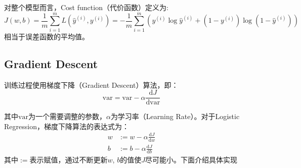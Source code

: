 对整个模型而言，Cost function（代价函数）定义为:
\begin{equation}
	J(w, b) = \frac{1}{m} \sum_{i=1}^{m} L(\hat{y}^{(i)}, y^{(i)}) = -\frac{1}{m} \sum_{i=1}^{m} (y^{(i)} \log \hat{y}^{(i)} + (1 - y^{(i)}) \log (1 - \hat{y}^{(i)})) \label{eq:cost}
\end{equation}
相当于误差函数的平均值。

\subsection{Gradient Descent}

训练过程使用梯度下降（Gradient Descent）算法，即：
\begin{equation}
	\mathrm{var} = \mathrm{var} - \alpha \frac{\mathrm{d}J}{\mathrm{d}\mathrm{var}} \label{eq:gradient}
\end{equation}

其中$\mathrm{var}$为一个需要调整的参数，$\alpha$为学习率（Learning Rate）。对于Logistic Regression，梯度下降算法的表达式为：
\begin{equation}
	\begin{aligned}
	w &:= w - \alpha \frac{\mathrm{d}J}{\mathrm{d}w} \\
	b &:= b - \alpha \frac{\mathrm{d}J}{\mathrm{d}b}
	\end{aligned} 
	\label{eq:gradient_logistic}
\end{equation}
其中$:=$表示赋值，通过不断更新$w$, $b$的值使$J$尽可能小。下面介绍具体实现

